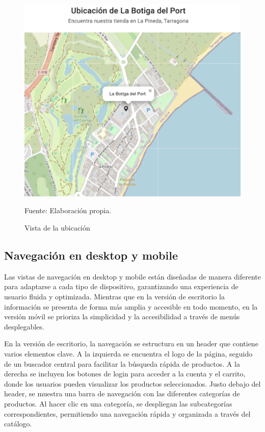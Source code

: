 \begin{figure}[H]
\begin{center}
\includegraphics[scale=0.5]{./Images/ubicacion.png}
\caption{Vista de la ubicación} Fuente: Elaboración propia.

\label{fig:fig2}

\end{center}
\end{figure}

\subsection{Navegación en desktop y mobile}\label{subsec5.1.4}
Las vistas de navegación en desktop y mobile están diseñadas de manera diferente para adaptarse a cada tipo de dispositivo, garantizando una experiencia de usuario fluida y optimizada. Mientras que en la versión de escritorio la información se presenta de forma más amplia y accesible en todo momento, en la versión móvil se prioriza la simplicidad y la accesibilidad a través de menús desplegables.

\vspace{0.5cm}

En la versión de escritorio, la navegación se estructura en un header que contiene varios elementos clave. A la izquierda se encuentra el logo de la página, seguido de un buscador central para facilitar la búsqueda rápida de productos. A la derecha se incluyen los botones de login para acceder a la cuenta y el carrito, donde los usuarios pueden visualizar los productos seleccionados. Justo debajo del header, se muestra una barra de navegación con las diferentes categorías de productos. Al hacer clic en una categoría, se despliegan las subcategorías correspondientes, permitiendo una navegación rápida y organizada a través del catálogo.

